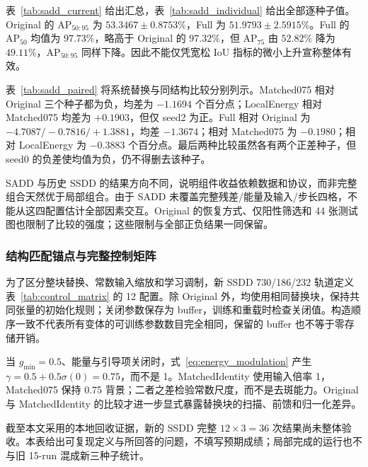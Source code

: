 表~\ref{tab:sadd_current} 给出汇总，表~\ref{tab:sadd_individual} 给出全部逐种子值。Original 的 AP$_{50:95}$ 为 $53.3467\pm0.8753\%$，Full 为 $51.9793\pm2.5915\%$。Full 的 AP$_{50}$ 均值为 $97.73\%$，略高于 Original 的 $97.32\%$，但 AP$_{75}$ 由 $52.82\%$ 降为 $49.11\%$，AP$_{50:95}$ 同样下降。因此不能仅凭宽松 IoU 指标的微小上升宣称整体有效。



表~\ref{tab:sadd_paired} 将系统替换与同结构比较分别列示。Matched075 相对 Original 三个种子都为负，均差为 $-1.1694$ 个百分点；LocalEnergy 相对 Matched075 均差为 $+0.1903$，但仅 seed2 为正。Full 相对 Original 为 $-4.7087/-0.7816/+1.3881$，均差 $-1.3674$；相对 Matched075 为 $-0.1980$；相对 LocalEnergy 为 $-0.3883$ 个百分点。最后两种比较虽然各有两个正差种子，但 seed0 的负差使均值为负，仍不得删去该种子。

SADD 与历史 SSDD 的结果方向不同，说明组件收益依赖数据和协议，而非完整组合天然优于局部组合。由于 SADD 未覆盖完整残差/能量及输入/步长四格，不能从这四配置估计全部因素交互。Original 的恢复方式、仅阳性筛选和 44 张测试图也限制了比较的强度；这些限制与全部正负结果一同保留。


\subsubsection{结构匹配锚点与完整控制矩阵}\label{sec:matched_controls}
为了区分整块替换、常数输入缩放和学习调制，新 SSDD 730/186/232 轨道定义表~\ref{tab:control_matrix} 的 12 配置。除 Original 外，均使用相同替换块，保持共同张量的初始化规则；关闭参数保存为 buffer，训练和重载时检查关闭值。构造顺序一致不代表所有变体的可训练参数数目完全相同，保留的 buffer 也不等于零存储开销。

当 $g_{\min}=0.5$、能量与引导项关闭时，式~\eqref{eq:energy_modulation} 产生 $\gamma=0.5+0.5\sigma(0)=0.75$，而不是 1。MatchedIdentity 使用输入倍率 1，Matched075 保持 0.75 背景；二者之差检验常数尺度，而不是去斑能力。Original 与 MatchedIdentity 的比较才进一步显式暴露替换块的扫描、前馈和归一化差异。

截至本文采用的本地回收证据，新的 SSDD 完整 $12\times3=36$ 次结果尚未整体验收。本表给出可复现定义与所回答的问题，不填写预期成绩；局部完成的运行也不与旧 15-run 混成新三种子统计。

